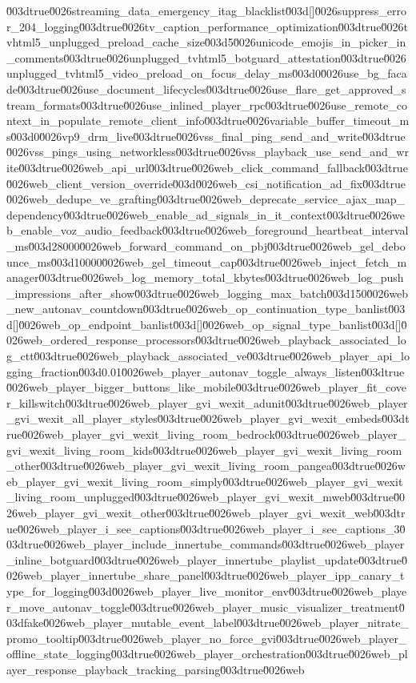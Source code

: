 {\u003dtrue\u0026streaming_data_emergency_itag_blacklist\u003d[]\u0026suppress_error_204_logging\u003dtrue\u0026tv_caption_performance_optimization\u003dtrue\u0026tvhtml5_unplugged_preload_cache_size\u003d5\u0026unicode_emojis_in_picker_in_comments\u003dtrue\u0026unplugged_tvhtml5_botguard_attestation\u003dtrue\u0026unplugged_tvhtml5_video_preload_on_focus_delay_ms\u003d0\u0026use_bg_facade\u003dtrue\u0026use_document_lifecycles\u003dtrue\u0026use_flare_get_approved_stream_formats\u003dtrue\u0026use_inlined_player_rpc\u003dtrue\u0026use_remote_context_in_populate_remote_client_info\u003dtrue\u0026variable_buffer_timeout_ms\u003d0\u0026vp9_drm_live\u003dtrue\u0026vss_final_ping_send_and_write\u003dtrue\u0026vss_pings_using_networkless\u003dtrue\u0026vss_playback_use_send_and_write\u003dtrue\u0026web_api_url\u003dtrue\u0026web_click_command_fallback\u003dtrue\u0026web_client_version_override\u003d\u0026web_csi_notification_ad_fix\u003dtrue\u0026web_dedupe_ve_grafting\u003dtrue\u0026web_deprecate_service_ajax_map_dependency\u003dtrue\u0026web_enable_ad_signals_in_it_context\u003dtrue\u0026web_enable_voz_audio_feedback\u003dtrue\u0026web_foreground_heartbeat_interval_ms\u003d28000\u0026web_forward_command_on_pbj\u003dtrue\u0026web_gel_debounce_ms\u003d10000\u0026web_gel_timeout_cap\u003dtrue\u0026web_inject_fetch_manager\u003dtrue\u0026web_log_memory_total_kbytes\u003dtrue\u0026web_log_push_impressions_after_show\u003dtrue\u0026web_logging_max_batch\u003d150\u0026web_new_autonav_countdown\u003dtrue\u0026web_op_continuation_type_banlist\u003d[]\u0026web_op_endpoint_banlist\u003d[]\u0026web_op_signal_type_banlist\u003d[]\u0026web_ordered_response_processors\u003dtrue\u0026web_playback_associated_log_ctt\u003dtrue\u0026web_playback_associated_ve\u003dtrue\u0026web_player_api_logging_fraction\u003d0.01\u0026web_player_autonav_toggle_always_listen\u003dtrue\u0026web_player_bigger_buttons_like_mobile\u003dtrue\u0026web_player_fit_cover_killswitch\u003dtrue\u0026web_player_gvi_wexit_adunit\u003dtrue\u0026web_player_gvi_wexit_all_player_styles\u003dtrue\u0026web_player_gvi_wexit_embeds\u003dtrue\u0026web_player_gvi_wexit_living_room_bedrock\u003dtrue\u0026web_player_gvi_wexit_living_room_kids\u003dtrue\u0026web_player_gvi_wexit_living_room_other\u003dtrue\u0026web_player_gvi_wexit_living_room_pangea\u003dtrue\u0026web_player_gvi_wexit_living_room_simply\u003dtrue\u0026web_player_gvi_wexit_living_room_unplugged\u003dtrue\u0026web_player_gvi_wexit_mweb\u003dtrue\u0026web_player_gvi_wexit_other\u003dtrue\u0026web_player_gvi_wexit_web\u003dtrue\u0026web_player_i_see_captions\u003dtrue\u0026web_player_i_see_captions_3\u003dtrue\u0026web_player_include_innertube_commands\u003dtrue\u0026web_player_inline_botguard\u003dtrue\u0026web_player_innertube_playlist_update\u003dtrue\u0026web_player_innertube_share_panel\u003dtrue\u0026web_player_ipp_canary_type_for_logging\u003d\u0026web_player_live_monitor_env\u003dtrue\u0026web_player_move_autonav_toggle\u003dtrue\u0026web_player_music_visualizer_treatment\u003dfake\u0026web_player_mutable_event_label\u003dtrue\u0026web_player_nitrate_promo_tooltip\u003dtrue\u0026web_player_no_force_gvi\u003dtrue\u0026web_player_offline_state_logging\u003dtrue\u0026web_player_orchestration\u003dtrue\u0026web_player_response_playback_tracking_parsing\u003dtrue\u0026web}
